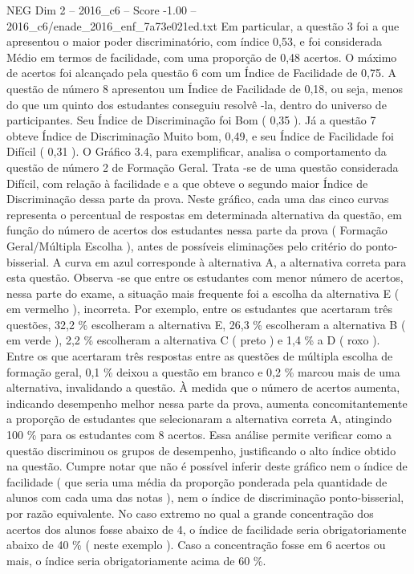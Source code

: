 \begin{textsample}{NEG Dim 2 – 2016\_c6 – Score -1.00 – 2016\_c6/enade\_2016\_enf\_7a73e021ed.txt}
Em particular, a questão 3 foi a que apresentou o maior poder discriminatório, com índice 0,53, e foi considerada Médio em termos de facilidade, com uma proporção de 0,48 acertos.
O máximo de acertos foi alcançado pela questão 6 com um Índice de Facilidade de 0,75.
A questão de número 8 apresentou um Índice de Facilidade de 0,18, ou seja, menos do que um quinto dos estudantes conseguiu resolvê -la, dentro do universo de participantes.
Seu Índice de Discriminação foi Bom ( 0,35 ).
Já a questão 7 obteve Índice de Discriminação Muito bom, 0,49, e seu Índice de Facilidade foi Difícil ( 0,31 ).
O Gráfico 3.4, para exemplificar, analisa o comportamento da questão de número 2 de Formação Geral.
Trata -se de uma questão considerada Difícil, com relação à facilidade e a que obteve o segundo maior Índice de Discriminação dessa parte da prova.
Neste gráfico, cada uma das cinco curvas representa o percentual de respostas em determinada alternativa da questão, em função do número de acertos dos estudantes nessa parte da prova ( Formação Geral/Múltipla Escolha ), antes de possíveis eliminações pelo critério do ponto-bisserial.
A curva em azul corresponde à alternativa A, a alternativa correta para esta questão.
Observa -se que entre os estudantes com menor número de acertos, nessa parte do exame, a situação mais frequente foi a escolha da alternativa E ( em vermelho ), incorreta.
Por exemplo, entre os estudantes que acertaram três questões, 32,2 \% escolheram a alternativa E, 26,3 \% escolheram a alternativa B ( em verde ), 2,2 \% escolheram a alternativa C ( preto ) e 1,4 \% a D ( roxo ).
Entre os que acertaram três respostas entre as questões de múltipla escolha de formação geral, 0,1 \% deixou a questão em branco e 0,2 \% marcou mais de uma alternativa, invalidando a questão.
À medida que o número de acertos aumenta, indicando desempenho melhor nessa parte da prova, aumenta concomitantemente a proporção de estudantes que selecionaram a alternativa correta A, atingindo 100 \% para os estudantes com 8 acertos.
Essa análise permite verificar como a questão discriminou os grupos de desempenho, justificando o alto índice obtido na questão.
Cumpre notar que não é possível inferir deste gráfico nem o índice de facilidade ( que seria uma média da proporção ponderada pela quantidade de alunos com cada uma das notas ), nem o índice de discriminação ponto-bisserial, por razão equivalente.
No caso extremo no qual a grande concentração dos acertos dos alunos fosse abaixo de 4, o índice de facilidade seria obrigatoriamente abaixo de 40 \% ( neste exemplo ).
Caso a concentração fosse em 6 acertos ou mais, o índice seria obrigatoriamente acima de 60 \%.

\end{textsample}
